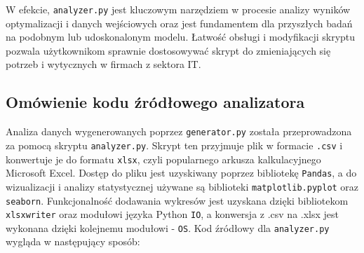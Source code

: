 \par W efekcie, \verb|analyzer.py| jest kluczowym narzędziem w procesie analizy wyników optymalizacji i danych wejściowych oraz jest fundamentem dla przyszłych badań na podobnym lub udoskonalonym modelu. Łatwość obsługi i modyfikacji skryptu pozwala użytkownikom sprawnie dostosowywać skrypt do zmieniających się potrzeb i wytycznych w firmach z sektora IT.

    \subsection{Omówienie kodu źródłowego analizatora}\label{sec:analyzer}
        \par Analiza danych wygenerowanych poprzez \verb|generator.py| została przeprowadzona za pomocą skryptu \verb|analyzer.py|. Skrypt ten przyjmuje plik w formacie \verb|.csv| i konwertuje je do formatu \verb|xlsx|, czyli popularnego arkusza kalkulacyjnego Microsoft Excel. Dostęp do pliku jest uzyskiwany poprzez bibliotekę \verb|Pandas|, a do wizualizacji i analizy statystycznej używane są biblioteki \verb|matplotlib.pyplot| oraz \verb|seaborn|. Funkcjonalność dodawania wykresów jest uzyskana dzięki bibliotekom \verb|xlsxwriter| oraz modułowi języka Python \verb|IO|, a konwersja z .csv na .xlsx jest wykonana dzięki kolejnemu modułowi - \verb|OS|. Kod źródłowy dla \verb|analyzer.py| wygląda w następujący sposób:

        

